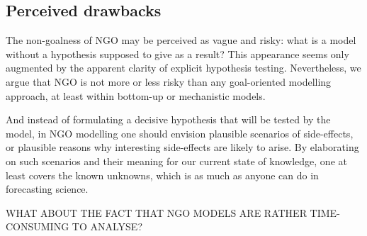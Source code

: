 \subsection{Perceived drawbacks}

The non-goalness of NGO may be perceived as vague and risky: what is a model without a hypothesis supposed to give as a result? This appearance seems only augmented by the apparent clarity of explicit hypothesis testing. Nevertheless, we argue that NGO is not more or less risky than any goal-oriented modelling approach, at least within bottom-up or mechanistic models. 

And instead of formulating a decisive hypothesis that will be tested by the model, in NGO modelling one should envision plausible scenarios of side-effects, or plausible reasons why interesting side-effects are likely to arise. By elaborating on such scenarios and their meaning for our current state of knowledge, one at least covers the known unknowns, which is as much as anyone can do in forecasting science.

WHAT ABOUT THE FACT THAT NGO MODELS ARE RATHER TIME-CONSUMING TO ANALYSE?